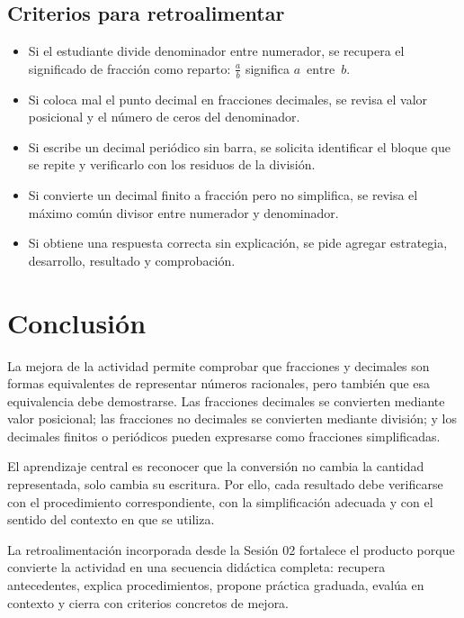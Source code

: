 \documentclass[
	spanish,
	letterpaper, oneside
]{article}
\newcommand{\DivOp}[2]{\ensuremath{#1\,\mbox{ entre }\,#2}}
\begin{document}
\subsection{Criterios para retroalimentar}

\begin{itemize}
	\item Si el estudiante divide denominador entre numerador, se recupera el significado de fracción como reparto: $\frac{a}{b}$ significa \DivOp{a}{b}.
	\item Si coloca mal el punto decimal en fracciones decimales, se revisa el valor posicional y el número de ceros del denominador.
	\item Si escribe un decimal periódico sin barra, se solicita identificar el bloque que se repite y verificarlo con los residuos de la división.
	\item Si convierte un decimal finito a fracción pero no simplifica, se revisa el máximo común divisor entre numerador y denominador.
	\item Si obtiene una respuesta correcta sin explicación, se pide agregar estrategia, desarrollo, resultado y comprobación.
\end{itemize}

\section{Conclusión}

La mejora de la actividad permite comprobar que fracciones y decimales son formas equivalentes de representar números racionales, pero también que esa equivalencia debe demostrarse. Las fracciones decimales se convierten mediante valor posicional; las fracciones no decimales se convierten mediante división; y los decimales finitos o periódicos pueden expresarse como fracciones simplificadas.

El aprendizaje central es reconocer que la conversión no cambia la cantidad representada, solo cambia su escritura. Por ello, cada resultado debe verificarse con el procedimiento correspondiente, con la simplificación adecuada y con el sentido del contexto en que se utiliza.

La retroalimentación incorporada desde la Sesión 02 fortalece el producto porque convierte la actividad en una secuencia didáctica completa: recupera antecedentes, explica procedimientos, propone práctica graduada, evalúa en contexto y cierra con criterios concretos de mejora.
\end{document}
